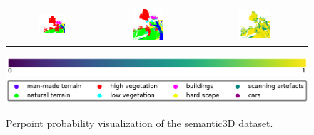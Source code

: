 \begin{figure}[h!]
\begin{tabular}{ccc}
            \includegraphics[width=0.33\textwidth, height=0.18\textheight]{images/seg_output/sem3d_seg_output/3_GT.pdf} &
            \includegraphics[width=0.33\textwidth, height=0.18\textheight]{images/seg_output/flipout/sem3d_3.pdf}& 
            \includegraphics[width=0.33\textwidth, height=0.18\textheight]{images/seg_output/flipout/3_fout_prob.pdf}\\
        \end{tabular}
        \includegraphics[scale=0.45]{images/prob_legend.pdf}
        \includegraphics[scale=0.45]{images/legend.png}
        \caption{Perpoint probability visualization of the semantic3D dataset.}
        \label{fig:fout_sem3d_probmap}
    \end{figure}

